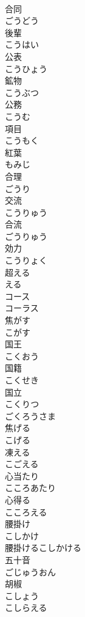 \documentclass[8pt]{extreport}
\begin{document}
\begin{CJK}{UTF8}{min}
\\	合同 
\\	ごうどう	
\\	後輩 
\\	こうはい	
\\	公表 
\\	こうひょう	
\\	鉱物 
\\	こうぶつ	
\\	公務 
\\	こうむ	
\\	項目 
\\	こうもく	
\\	紅葉 
\\	もみじ	
\\	合理 
\\	ごうり	
\\	交流 
\\	こうりゅう	
\\	合流 
\\	ごうりゅう	
\\	効力 
\\	こうりょく	
\\	超える 
\\	える	
\\	コース	
\\	コーラス	
\\	焦がす 
\\	こがす	
\\	国王 
\\	こくおう	
\\	国籍 
\\	こくせき	
\\	国立 
\\	こくりつ	
\\	ごくろうさま	
\\	焦げる 
\\	こげる	
\\	凍える 
\\	こごえる	
\\	心当たり 
\\	こころあたり	
\\	心得る 
\\	こころえる	
\\	腰掛け 
\\	こしかけ	
\\	腰掛けるこしかける	
\\	五十音 
\\	ごじゅうおん	
\\	胡椒 
\\	こしょう	
\\	こしらえる	

\end{CJK}
\end{document}
